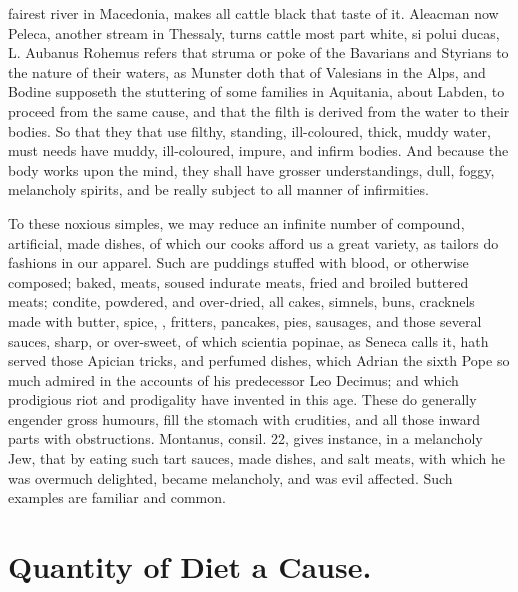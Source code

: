 {{fairest river in Macedonia, makes all cattle black that taste of it.
Aleacman now Peleca, another stream in Thessaly, turns cattle most part
white, si polui ducas, L. Aubanus Rohemus refers that struma or
poke of the Bavarians and Styrians to the nature of their waters, as
Munster doth that of Valesians in the Alps, and Bodine
supposeth the stuttering of some families in Aquitania, about Labden,
to proceed from the same cause, and that the filth is derived from the
water to their bodies. So that they that use filthy, standing,
ill-coloured, thick, muddy water, must needs have muddy, ill-coloured,
impure, and infirm bodies. And because the body works upon the mind,
they shall have grosser understandings, dull, foggy, melancholy
spirits, and be really subject to all manner of infirmities.

To these noxious simples, we may reduce an infinite number of compound,
artificial, made dishes, of which our cooks afford us a great variety,
as tailors do fashions in our apparel. Such are puddings stuffed
with blood, or otherwise composed; baked, meats, soused indurate meats,
fried and broiled buttered meats; condite, powdered, and over-dried,
all cakes, simnels, buns, cracknels made with butter, spice, \etc{},
fritters, pancakes, pies, sausages, and those several sauces, sharp, or
over-sweet, of which scientia popinae, as Seneca calls it, hath served
those  Apician tricks, and perfumed dishes, which Adrian the
sixth Pope so much admired in the accounts of his predecessor Leo
Decimus; and which prodigious riot and prodigality have invented in
this age. These do generally engender gross humours, fill the stomach
with crudities, and all those inward parts with obstructions. Montanus,
consil. 22, gives instance, in a melancholy Jew, that by eating such
tart sauces, made dishes, and salt meats, with which he was overmuch
delighted, became melancholy, and was evil affected. Such examples are
familiar and common.

\section{Quantity of Diet a Cause.}

}}

